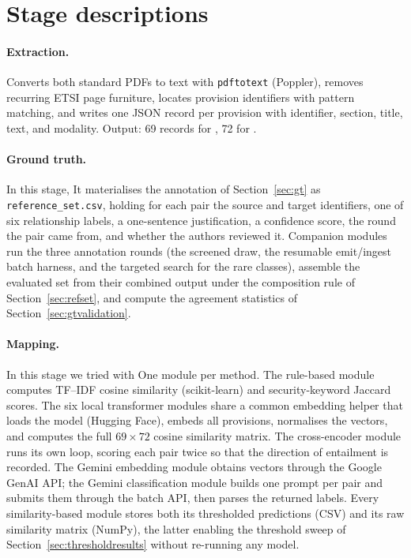 \section{Stage descriptions}

\paragraph{Extraction.} Converts both standard PDFs to text with
\texttt{pdftotext} (Poppler), removes recurring ETSI page furniture, locates
provision identifiers with pattern matching, and writes one JSON record per
provision with identifier, section, title, text, and modality. Output: 69
records for \standardA{}, 72 for \standardB{}.

\paragraph{Ground truth.} In this stage, It materialises the annotation of Section~\ref{sec:gt}
as \texttt{reference\_set.csv}, holding for each pair the source and target
identifiers, one of six relationship labels, a one-sentence justification, a
confidence score, the round the pair came from, and whether the authors reviewed
it. Companion modules run the three annotation rounds (the screened draw, the
resumable emit/ingest batch harness, and the targeted search for the rare
classes), assemble the evaluated set from their combined output under the
composition rule of Section~\ref{sec:refset}, and compute the agreement
statistics of Section~\ref{sec:gtvalidation}.

\paragraph{Mapping.} In this stage we tried with One module per method. The rule-based module computes
TF--IDF cosine similarity (scikit-learn) and security-keyword Jaccard scores.
The six local transformer modules share a common embedding helper that
loads the model (Hugging Face), embeds all provisions, normalises the
vectors, and computes the full $69 \times 72$ cosine similarity matrix. The
cross-encoder module runs its own loop, scoring each pair twice so that the
direction of entailment is recorded. The
Gemini embedding module obtains vectors through the Google GenAI API; the
Gemini classification module builds one prompt per pair and submits them
through the batch API, then parses the returned labels. Every
similarity-based module stores both its thresholded predictions (CSV) and its
raw similarity matrix (NumPy), the latter enabling the threshold sweep of
Section~\ref{sec:thresholdresults} without re-running any model.

